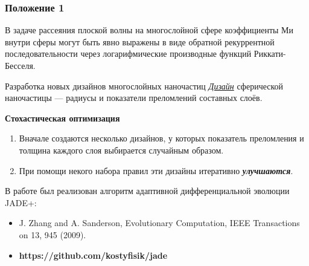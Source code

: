 \documentclass[14pt]{beamer}
\begin{document}
\begin{frame}
  \frametitle{Положение 1}
  \begin{center}
    В задаче рассеяния плоской волны на многослойной сфере
    коэффициенты Ми внутри сферы могут быть явно выражены в виде
    обратной рекуррентной последовательности через логарифмические
    производные функций Риккати-Бесселя.
  \end{center}
\end{frame}

\begin{frame} {\normalsize Разработка новых дизайнов многослойных
    наночастиц}
  \small \underline{\textit{Дизайн}} сферической наночастицы --- радиусы и показатели преломлений
  составных слоёв.


  \vspace{1em}
  \normalsize
  \textbf{Стохастическая оптимизация}
  \small
    \begin{enumerate}
    \item Вначале создаются несколько дизайнов, у которых показатель
      преломления и толщина каждого слоя выбирается случайным образом.
    \item При помощи некого набора правил эти дизайны итеративно
      \textit{\textbf{улучшаются}}.
    \end{enumerate}

  В работе был реализован алгоритм адаптивной дифференциальной
  эволюции  JADE+:
    \begin{itemize}
    \item J. Zhang and A. Sanderson, Evolutionary Computation, IEEE
    Transactions on 13, 945 (2009).
  \item \textbf{https://github.com/kostyfisik/jade}
    \end{itemize}

\end{frame}
\end{document}
